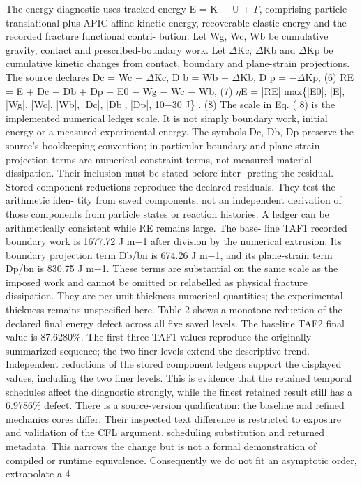 \documentclass[11pt]{article}
\begin{document}
The energy diagnostic uses tracked energy E = K + U + \ensuremath{\Gamma}, comprising particle translational plus
APIC affine kinetic energy, recoverable elastic energy and the recorded fracture functional contri-
bution. Let Wg, Wc, Wb be cumulative gravity, contact and prescribed-boundary work. Let \ensuremath{\Delta}Kc,
\ensuremath{\Delta}Kb and \ensuremath{\Delta}Kp be cumulative kinetic changes from contact, boundary and plane-strain projections.
The source declares
Dc = Wc \ensuremath{-} \ensuremath{\Delta}Kc, D b = Wb \ensuremath{-} \ensuremath{\Delta}Kb, D p = \ensuremath{-}\ensuremath{\Delta}Kp, (6)
RE = E + Dc + Db + Dp \ensuremath{-} E0 \ensuremath{-} Wg \ensuremath{-} Wc \ensuremath{-} Wb, (7)
\ensuremath{\eta}E = |RE|
max\{|E0|, |E|, |Wg|, |Wc|, |Wb|, |Dc|, |Db|, |Dp|, 10\ensuremath{-}30 J\} . (8)
The scale in Eq. ( 8) is the implemented numerical ledger scale. It is not simply boundary work,
initial energy or a measured experimental energy. The symbols Dc, Db, Dp preserve the source’s
bookkeeping convention; in particular boundary and plane-strain projection terms are numerical
constraint terms, not measured material dissipation. Their inclusion must be stated before inter-
preting the residual.
Stored-component reductions reproduce the declared residuals. They test the arithmetic iden-
tity from saved components, not an independent derivation of those components from particle states
or reaction histories. A ledger can be arithmetically consistent while RE remains large. The base-
line TAF1 recorded boundary work is 1677.72 J m\ensuremath{-}1 after division by the numerical extrusion. Its
boundary projection term Db/bn is 674.26 J m\ensuremath{-}1, and its plane-strain term Dp/bn is 830.75 J m\ensuremath{-}1.
These terms are substantial on the same scale as the imposed work and cannot be omitted or
relabelled as physical fracture dissipation. They are per-unit-thickness numerical quantities; the
experimental thickness remains unspecified here.
Table 2 shows a monotone reduction of the declared final energy defect across all five saved
levels. The baseline TAF2 final value is 87.6280\%. The first three TAF1 values reproduce the
originally summarized sequence; the two finer levels extend the descriptive trend. Independent
reductions of the stored component ledgers support the displayed values, including the two finer
levels. This is evidence that the retained temporal schedules affect the diagnostic strongly, while
the finest retained result still has a 6.9786\% defect.
There is a source-version qualification: the baseline and refined mechanics cores differ. Their
inspected text difference is restricted to exposure and validation of the CFL argument, scheduling
substitution and returned metadata. This narrows the change but is not a formal demonstration
of compiled or runtime equivalence. Consequently we do not fit an asymptotic order, extrapolate a
4
\end{document}
